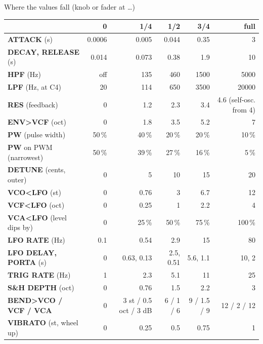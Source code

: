 \documentclass{article}
\newcommand{\MD}[1]{\textcolor{modc}{#1}}
\newcommand{\VC}[1]{\textcolor{vcoc}{#1}}
\newcommand{\FL}[1]{\textcolor{fltc}{#1}}
\newcommand{\EG}[1]{\textcolor{egc}{#1}}
\begin{document}
\begin{minipage}[t]{128mm}\vspace{0pt}
\begin{card}{Where the values fall (knob or fader at \dots)}
\fontsize{7.3}{8.9}\selectfont
\setlength{\tabcolsep}{3pt}
\begin{tabular}{@{}l r r r r r@{}}
 & 0 & 1/4 & 1/2 & 3/4 & full \\ \hline
\EG{\textbf{ATTACK}} (s) & 0.0006 & 0.005 & 0.044 & 0.35 & 3 \\
\EG{\textbf{DECAY, RELEASE}} (s) & 0.014 & 0.073 & 0.38 & 1.9 & 10 \\
\FL{\textbf{HPF}} (Hz) & off & 135 & 460 & 1500 & 5000 \\
\FL{\textbf{LPF}} (Hz, at C4) & 20 & 114 & 650 & 3500 & 20000 \\
\FL{\textbf{RES}} (feedback) & 0 & 1.2 & 2.3 & 3.4 & 4.6 (self-osc. from 4) \\
\FL{\textbf{ENV>VCF}} (oct) & 0 & 1.8 & 3.5 & 5.2 & 7 \\
\VC{\textbf{PW}} (pulse width) & 50\,\% & 40\,\% & 20\,\% & 20\,\% & 10\,\% \\
\VC{\textbf{PW}} on PWM (narrowest) & 50\,\% & 39\,\% & 27\,\% & 16\,\% & 5\,\% \\
\VC{\textbf{DETUNE}} (cents, outer) & 0 & 5 & 10 & 15 & 20 \\
\VC{\textbf{VCO<LFO}} (st) & 0 & 0.76 & 3 & 6.7 & 12 \\
\FL{\textbf{VCF<LFO}} (oct) & 0 & 0.25 & 1 & 2.2 & 4 \\
\textbf{VCA<LFO} (level dips by) & 0 & 25\,\% & 50\,\% & 75\,\% & 100\,\% \\
\textbf{LFO RATE} (Hz) & 0.1 & 0.54 & 2.9 & 15 & 80 \\
\textbf{LFO DELAY, PORTA} (s) & 0 & 0.63, 0.13 & 2.5, 0.51 & 5.6, 1.1 & 10, 2 \\
\MD{\textbf{TRIG RATE}} (Hz) & 1 & 2.3 & 5.1 & 11 & 25 \\
\MD{\textbf{S\&H DEPTH}} (oct) & 0 & 0.76 & 1.5 & 2.2 & 3 \\
\MD{\textbf{BEND>VCO / VCF / VCA}} & 0 & 3 st / 0.5 oct / 3 dB & 6 / 1 / 6 & 9 / 1.5 / 9 & 12 / 2 / 12 \\
\MD{\textbf{VIBRATO}} (st, wheel up) & 0 & 0.25 & 0.5 & 0.75 & 1 \\
\end{tabular}
\end{card}


\end{minipage}
\end{document}
